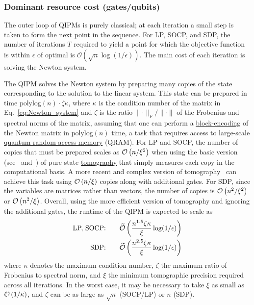 \begin{refsection}
\subsubsection*{Dominant resource cost (gates/qubits)}

The outer loop of QIPMs is purely classical; at each iteration a small step is taken to form the next point in the sequence. For LP, SOCP, and SDP, the number of iterations $T$ required to yield a point for which the objective function is within $\epsilon$ of optimal is $\mathcal{O}(\sqrt{n}\log(1/\epsilon))$. The main cost of each iteration is solving the Newton system. 

The QIPM solves the Newton system by preparing many copies of the state corresponding to the solution to the linear system. This state can be prepared in time $\text{polylog}(n)\cdot \zeta \kappa$, where $\kappa$ is the condition number of the matrix in Eq.~\eqref{eq:Newton_system} and $\zeta$ is the ratio $\lVert \cdot \rVert_F / \lVert \cdot \rVert$ of the Frobenius and spectral norms of the matrix, assuming that one can perform a \hyperref[prim:BlockEncodingsClassical]{block-encoding} of the Newton matrix in $\text{polylog}(n)$ time, a task that requires access to large-scale \hyperref[prim:QRAM]{quantum random access memory} (QRAM). For LP and SOCP, the number of copies that must be prepared scales as $\mathcal{O}\left( n/\xi^2 \right)$ when using the basic version (see~\cite[Section 4]{kerenidis2018QIntPoint} and~\cite[Section IVD]{dalzell2022socp}) of pure state \hyperref[prim:Tomography]{tomography} that simply measures each copy in the computational basis. A more recent and complex version of tomography~\cite{apeldoorn2022TomographyStatePreparationUnitaries} can achieve this task using $\mathcal{O}\left( n/\xi \right)$ copies along with additional gates. For SDP, since the variables are matrices rather than vectors, the number of copies is $\mathcal{O}\left( n^2/\xi^2 \right)$ or $\mathcal{O}\left( n^2/\xi \right)$. Overall, using the more efficient version of tomography and ignoring the additional gates, the runtime of the QIPM is expected to scale as 
\begin{equation}
\begin{split}
    \text{LP, SOCP:}& \qquad \widetilde{\mathcal{O}}\left(  \frac{n^{1.5}\zeta \kappa}{\xi}\log(1/\epsilon) \right) \\
    \text{SDP:}& \qquad \widetilde{\mathcal{O}}\left( \frac{n^{2.5}\zeta \kappa}{\xi}\log(1/\epsilon) \right)
\end{split}
\end{equation}
where $\kappa$ denotes the maximum condition number, $\zeta$ the maximum ratio of Frobenius to spectral norm, and $\xi$ the minimum tomographic precision required across all iterations. In the worst case, it may be necessary to take $\xi$ as small as $\mathcal{O}\left( 1/\kappa \right)$, and $\zeta$ can be as large as $\sqrt{n}$ (SOCP/LP) or $n$ (SDP). 

\end{refsection}
